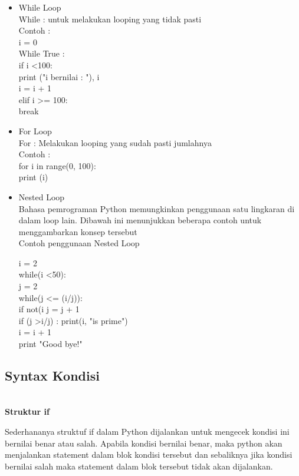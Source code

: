 \documentclass{article}
\begin{document}
\begin{itemize}
    \item While Loop\\
While : untuk melakukan looping yang tidak pasti\\
Contoh :\\
i = 0\\
While True :\\
    if i \textless 100:\\
        print ("i bernilai : "), i\\
        i = i + 1\\
    elif i \textgreater = 100:\\
        break\\
    \item For Loop\\
For : Melakukan looping yang sudah pasti jumlahnya\\
Contoh :\\
for i in range(0, 100):\\
    print (i)\\
    \item Nested Loop\\
Bahasa pemrograman Python memungkinkan penggunaan satu lingkaran di dalam loop lain. Dibawah ini menunjukkan beberapa contoh untuk menggambarkan konsep tersebut \\
Contoh penggunaan Nested Loop

i = 2\\
while(i \textless 50):\\
    j = 2\\
    while(j \textless= (i/j)):\\
        if not(i%
        j = j + 1\\
    if (j \textgreater i/j) : print(i, "is prime")\\
    i = i + 1\\
print "Good bye!"
\end{itemize}

    \subsection {Syntax Kondisi}\\
    \textbf{Struktur if}
    \item Sederhananya struktuf if dalam Python dijalankan untuk mengecek kondisi ini bernilai benar atau salah. Apabila kondisi  bernilai benar, maka python akan menjalankan statement dalam blok kondisi tersebut dan sebaliknya jika kondisi bernilai salah maka statement dalam blok tersebut tidak akan dijalankan.\\
    
\end{document}
